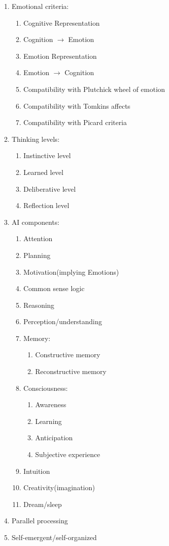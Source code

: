 \begin{enumerate}
 \item  Emotional criteria:
 \begin{enumerate}
  \item  Cognitive Representation
  \item  Cognition $\rightarrow$ Emotion
  \item  Emotion Representation
  \item  Emotion $\rightarrow$ Cognition
  \item  Compatibility with Plutchick wheel of emotion
  \item  Compatibility with Tomkins affects
  \item  Compatibility with Picard criteria
 \end{enumerate}
 \item  Thinking levels:
 \begin{enumerate}
  \item  Instinctive level
  \item  Learned level
  \item  Deliberative level
  \item  Reflection level
 \end{enumerate}
 \item  AI components:
 \begin{enumerate}
  \item  Attention
  \item  Planning
  \item  Motivation(implying Emotions)
  \item  Common sense logic
  \item  Reasoning
  \item  Perception/understanding
  \item  Memory:
  \begin{enumerate}
   \item  Constructive memory
   \item  Reconstructive memory
  \end{enumerate}
  \item  Consciousness:
  \begin{enumerate}
   \item  Awareness
   \item  Learning
   \item  Anticipation
   \item  Subjective experience
  \end{enumerate}
  \item  Intuition
  \item  Creativity(imagination)
  \item  Dream/sleep
 \end{enumerate}
 \item  Parallel processing
 \item  Self-emergent/self-organized
\end{enumerate}


